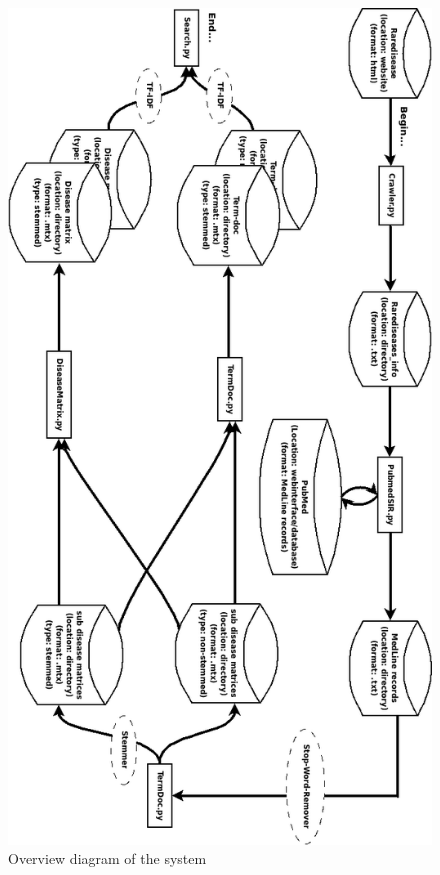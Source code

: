\begin{figure}[!h]
        \begin{center}
          \includegraphics[width=1.0\textwidth]{diagrammer/system_overview_rotate.png}
        \end{center}
        \caption{Overview diagram of the system}
        \label{OverviewDiagram}
\end{figure}


